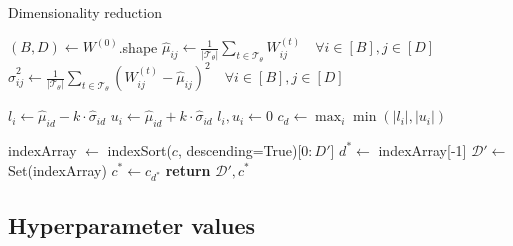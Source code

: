 \begin{algorithm} %
	\caption{Dimensionality reduction} %
	\label{alg:retained-set} %
	\begin{algorithmic} %
		
		\State $(B, D) \gets W^{(0)}$.shape
		\State $\hat{\mu}_{ij} \gets \frac{1}{|\mathcal{T}_\theta|} \sum_{t \in \mathcal{T}_\theta} W_{ij}^{(t)} \quad \forall i \in [B], j \in [D]$
		\State $\hat{\sigma}_{ij}^2 \gets \frac{1}{|\mathcal{T}_\theta|} \sum_{t \in \mathcal{T}_\theta} \left( W_{ij}^{(t)} - \hat{\mu}_{ij} \right)^2 \quad \forall i \in [B], j \in [D]$
		
		\item[]
		
				\State $l_i \gets \hat{\mu}_{id} - k \cdot \hat{\sigma}_{id}$
				\State $u_i \gets \hat{\mu}_{id} + k \cdot \hat{\sigma}_{id}$
					\State $l_i, u_i \gets 0$
				\EndIf
			\EndFor
			\State $c_d \gets \max_i \min\left(|l_i|, |u_i| \right)$
		\EndFor
		
		\item[]
		
		\State indexArray $\gets$ indexSort($c$, descending=True)[$0:D'$]
		\State $d^* \gets$ indexArray[-1]
		\State $\mathcal{D}' \gets $ Set(indexArray)
		\State $c^* \gets c_{d^*}$
		\State \textbf{return} $\mathcal{D}', c^*$
		\EndProcedure
	\end{algorithmic}
\end{algorithm}

\FloatBarrier
\subsection{Hyperparameter values}
\label{appdx:hyperparams}

\begin{table}[!h]
	\centering
	\caption{Hyper-parameter values for each experiment}
	\label{tab:hyperparams}
\end{table}

